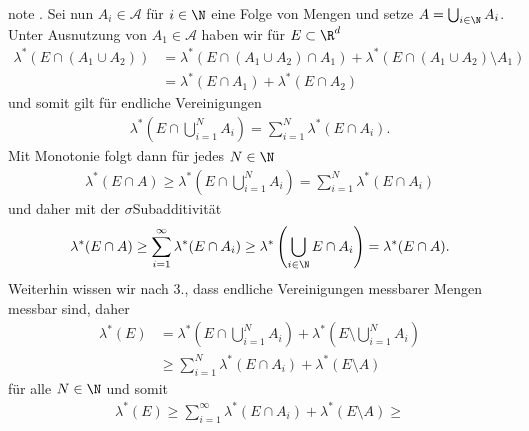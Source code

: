 \documentclass[letterpaper,10pt,german]{jupyterBook}
\begin{document}
\begin{sphinxadmonition}{note}
. Sei nun \(A_i\in\mathcal{A}\) für \(i\in\N\) eine  Folge von Mengen und setze \(A=\bigcup_{i\in\N} A_i\). Unter Ausnutzung von \(A_1\in\mathcal{A}\) haben wir für \(E\subset\R^d\)
\begin{equation*}
\begin{split}\lambda^\ast(E\cap (A_1\cup A_2)) &= \lambda^\ast(E\cap(A_1\cup A_2)\cap A_1) + \lambda^\ast(E\cap(A_1\cup A_2)\setminus A_1)\\
&=
\lambda^\ast(E\cap A_1) + \lambda^\ast(E\cap A_2)\end{split}
\end{equation*}
\sphinxAtStartPar
und somit gilt für endliche Vereinigungen
\begin{equation*}
\begin{split}\lambda^\ast(E\cap \bigcup_{i=1}^N A_i) = \sum_{i=1}^N \lambda^\ast(E\cap A_i).\end{split}
\end{equation*}
\sphinxAtStartPar
Mit Monotonie folgt dann für jedes \(N\in\N\)
\begin{equation*}
\begin{split}\lambda^\ast(E\cap A)\geq \lambda^\ast(E\cap \bigcup_{i=1}^N A_i) = \sum_{i=1}^N \lambda^\ast(E\cap A_i)\end{split}
\end{equation*}
\sphinxAtStartPar
und daher mit der \(\sigma\)\sphinxhyphen{}Subadditivität
\begin{equation}\label{equation:masstheorie/masstheorie:eq:LebesgueAlgebra}
\begin{split}\lambda^\ast(E\cap A) \geq \sum_{i=1}^\infty \lambda^\ast(E\cap A_i)\geq \lambda^\ast\left(\bigcup_{i\in\N} E\cap A_i\right) = \lambda^\ast(E\cap A).\end{split}
\end{equation}
\sphinxAtStartPar
Weiterhin wissen wir nach 3., dass endliche Vereinigungen messbarer Mengen messbar sind, daher
\begin{equation*}
\begin{split}\lambda^\ast(E) &= \lambda^\ast\left(E\cap \bigcup_{i=1}^N A_i\right) + \lambda^\ast\left(E\setminus \bigcup_{i=1}^N A_i\right)\\
&\geq
\sum_{i=1}^N \lambda^\ast(E\cap A_i) + \lambda^\ast(E\setminus A)\end{split}
\end{equation*}
\sphinxAtStartPar
für alle \(N\in\N\) und somit
\begin{equation*}
\begin{split}\lambda^\ast(E)\geq \sum_{i=1}^\infty \lambda^\ast(E\cap A_i) + \lambda^\ast(E\setminus A)\geq 

\end{split}
\end{equation*}
\end{sphinxadmonition}
\end{document}
